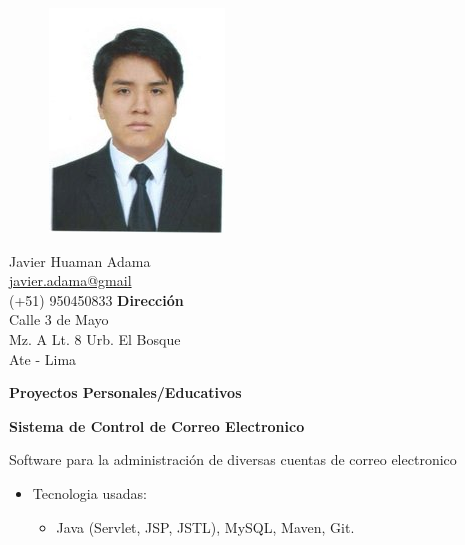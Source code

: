 \documentclass[a4paper,12pt,final]{memoir}
\newcommand{\Sep}{\vspace{1.5em}}
\newcommand{\SmallSep}{\vspace{0.5em}}
\newcommand{\CVSection}[1]
	{\Large\textbf{#1}\par
	\SmallSep\normalsize\normalfont}
\newcommand{\CVItem}[1]
	{\textbf{\color{RoyalBlue} #1}}
\begin{document}
\clearpage

\begin{figure}
	\hfill
	\includegraphics[width=0.6\columnwidth]{profile}
	\vspace{-7cm}
\end{figure}

\begin{flushright}\small
	Javier Huaman Adama \\
	\url{javier.adama@gmail}  \\
	(+51) 950450833
	\Sep
	\textbf{Dirección} \\
	Calle 3 de Mayo \\ %
	Mz. A Lt. 8 Urb. El Bosque \\ %
	Ate - Lima \\ %
\end{flushright}\normalsize
\framebreak


\CVSection{Proyectos Personales/Educativos}


\CVItem{Sistema de Control de Correo Electronico}{
Software para la administración de diversas cuentas de correo electronico
\begin{itemize}[noitemsep]
  \item Tecnologia usadas:
  \begin{itemize}
    \item Java (Servlet, JSP, JSTL), MySQL, Maven, Git.
  \end{itemize}
\end{itemize}
}
\end{document}
